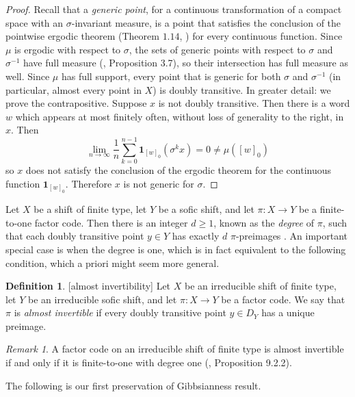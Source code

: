 \documentclass{amsproc}
\numberwithin{theorem}{section}
\theoremstyle{remark}
\newtheorem*{remark}{Remark}
\theoremstyle{definition}
\newtheorem{defn}[theorem]{Definition}
\theoremstyle{plain}
\begin{document}
\begin{proof}
Recall that a \textit{generic point}, for a continuous transformation of a compact space with an $\sigma$-invariant measure, is a point that satisfies the conclusion of the pointwise ergodic theorem (Theorem $1.14$, \cite{walters1982ergodic}) for every continuous function. Since $\mu$ is ergodic with respect to $\sigma$, the sets of generic points with respect to $\sigma$ and $\sigma^{-1}$ have full measure (\cite{furstenberg-1981-recurrence}, Proposition 3.7), so their intersection has full measure as well. Since $\mu$ has full support, every point that is generic for both $\sigma$ and $\sigma^{-1}$ (in particular, almost every point in $X$) is doubly transitive. In greater detail: we prove the contrapositive. Suppose $x$ is not doubly transitive. Then there is a word $w$ which appears at most finitely often, without loss of generality to the right, in $x$. Then
\[
\lim_{n \to \infty} \frac{1}{n} \sum_{k=0}^{n-1} \mathbf{1}_{[w]_0} (\sigma^k x) = 0 \neq \mu([w]_0)
\]
so $x$ does not satisfy the conclusion of the ergodic theorem for the continuous function $\mathbf{1}_{[w]_0}$. Therefore $x$ is not generic for $\sigma$.
\end{proof}

Let $X$ be a shift of finite type, let $Y$ be a sofic shift, and let $\pi: X \to Y$ be a finite-to-one factor code. Then there is an integer $d \geq 1$, known as the \textit{degree} of $\pi$, such that each doubly transitive point $y \in Y$ has exactly $d$ $\pi$-preimages \cite{lind1995introduction}. An important special case is when the degree is one, which is in fact equivalent to the following condition, which a priori might seem more general.

\begin{defn}\label{almost-invertibility}[almost invertibility]
Let $X$ be an irreducible shift of finite type, let $Y$ be an irreducible sofic shift, and let $\pi: X \to Y$ be a factor code. We say that $\pi$ is \textit{almost invertible} if every doubly transitive point $y \in D_Y$ has a unique preimage.
\end{defn}

\begin{remark} A factor code on an irreducible shift of finite type is almost invertible if and only if it is finite-to-one with degree one (\cite{lind1995introduction}, Proposition 9.2.2).
\end{remark}

The following is our first preservation of Gibbsianness result.
\end{document}
